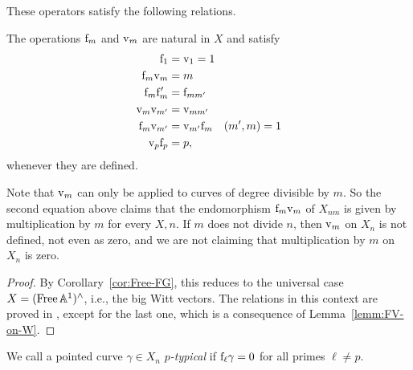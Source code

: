 These operators satisfy the following relations.
\begin{lemma} \label{lemm:frob-ver-identities}
The operations $\mathrm f_m$ and $\mathrm v_m$ are natural in $X$ and satisfy
\begin{align*}
\mathrm f_1 &= \mathrm v_1 = 1 \\
\mathrm f_m\mathrm v_m &= m \\
\mathrm f_m\mathrm f_m' &= \mathrm f_{m m'} \\
\mathrm v_m\mathrm v_{m'} &= \mathrm v_{m m'} \\
\mathrm f_m\mathrm v_{m'} &= \mathrm v_{m'}\mathrm f_m \quad (m',m)=1 \\
\mathrm v_p\mathrm f_p &= p,
\end{align*}
whenever they are defined.
\end{lemma}
Note that $\mathrm v_m$ can only be applied to curves of degree divisible by $m$.
So the second equation above claims that the endomorphism $\mathrm f_m \mathrm v_m$ of $X_{nm}$ is given by multiplication by $m$ for every $X, n$.
If $m$ does not divide $n$, then $\mathrm v_m$ on $X_n$ is not defined, not even as zero, and we are not claiming that multiplication by $m$ on $X_n$ is zero.
\begin{proof}
By Corollary~\ref{cor:Free-FG}, this reduces to the universal case $X=(\operatorname{Free}\mathbb A^1)^\wedge$, i.e., the big Witt vectors.
The relations in this context are proved in \cite[Theorem 13.48]{hazewinkel-witt-vectors}, except for the last one, which is a consequence of Lemma~\ref{lemm:FV-on-W}.
\end{proof}

\begin{definition}
We call a pointed curve $\gamma \in X_n$ \emph{$p$-typical} if $\mathrm f_\ell \gamma = 0$ for all primes $\ell \ne p$.
\end{definition}

